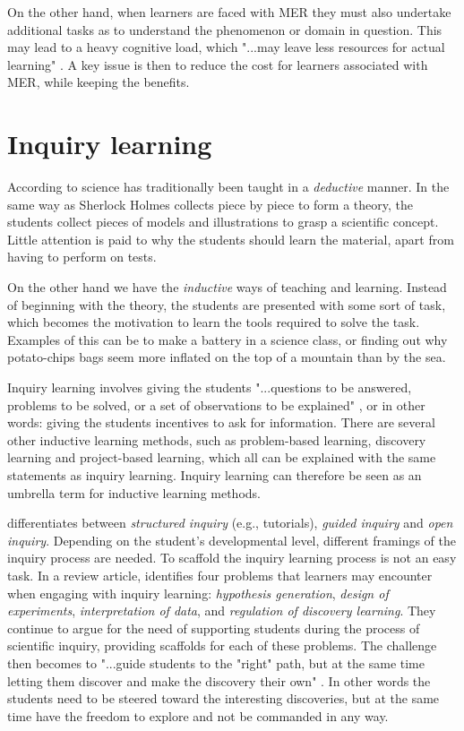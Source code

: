 On the other hand, when learners are faced with MER they must also undertake additional tasks as to understand the phenomenon or domain in question. This may lead to a heavy cognitive load, which "...may leave less resources for actual learning" \citetext{\citealp{sweller1988cognitive,sweller1989cognitive}, referenced in \citealp{van2006supporting}, p. 200}. A key issue is then to reduce the cost for learners associated with MER, while keeping the benefits. 

\section{Inquiry learning}
According to \citet{prince2006inductive} science has traditionally been taught in a \textit{deductive} manner. In the same way as Sherlock Holmes collects piece by piece to form a theory, the students collect pieces of models and illustrations to grasp a scientific concept. Little attention is paid to why the students should learn the material, apart from having to perform on tests.

On the other hand we have the \textit{inductive} ways of teaching and learning. Instead of beginning with the theory, the students are presented with some sort of task, which becomes the motivation to learn the tools required to solve the task. Examples of this can be to make a battery in a science class, or finding out why potato-chips bags seem more inflated on the top of a mountain than by the sea.

Inquiry learning involves giving the students "...questions to be answered, problems to be solved, or a set of observations to be explained" \citep[p. 127]{prince2006inductive}, or in other words: giving the students incentives to ask for information. There are several other inductive learning methods, such as problem-based learning, discovery learning and project-based learning, which all can be explained with the same statements as inquiry learning. Inquiry learning can therefore be seen as an umbrella term for inductive learning methods. \citep{prince2006inductive}

\citeauthor*{staver1987analysis} \citetext{\citeyear{staver1987analysis}, referenced in \citealp{prince2006inductive}} differentiates between \emph{structured inquiry} (e.g., tutorials), \emph{guided inquiry} and \emph{open inquiry}. Depending on the student's developmental level, different framings of the inquiry process are needed. To scaffold the inquiry learning process is not an easy task. In a review article, \citet{de1998scientific} identifies four problems that learners may encounter when engaging with inquiry learning: \textit{hypothesis generation}, \textit{design of experiments}, \textit{interpretation of data}, and \textit{regulation of discovery learning}. They continue to argue for the need of supporting students during the process of scientific inquiry, providing scaffolds for each of these problems. The challenge then becomes to "...guide students to the "right" path, but at the
same time letting them discover and make the discovery their own" \citep[p. 247]{kluge2010simulation}. In other words the students need to be steered toward the interesting discoveries, but at the same time have the freedom to explore and not be commanded in any way.

